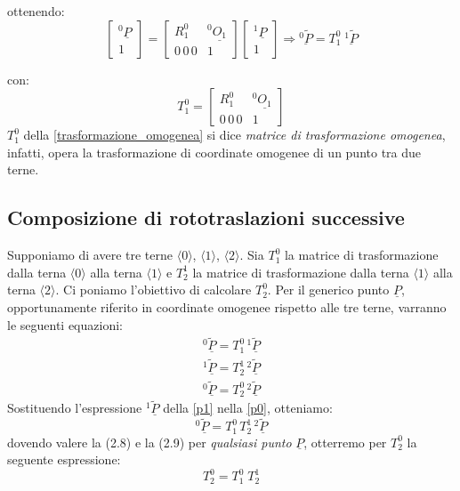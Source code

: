 ottenendo:
\begin{equation}
	\begin{bmatrix}
		^0\underline{P} \\
		1
	\end{bmatrix}
	=
	\begin{bmatrix}
		R_1^0 & ^0\underline{O_1} \\
		0\,0\,0 & 1
	\end{bmatrix}
	\begin{bmatrix}
		^1\underline{P} \\
		1
	\end{bmatrix}
	\Rightarrow
	\underline{^0\tilde{P}} = T_1^0 \; \underline{^1\tilde{P}}
\end{equation}

con:
\begin{equation} \label{trasformazione_omogenea}
	T_1^0 =
	\begin{bmatrix}
		R_1^0 & ^0\underline{O_1} \\
		0\,0\,0 & 1
	\end{bmatrix}
\end{equation}
$T_1^0$ della \eqref{trasformazione_omogenea} si dice \emph{matrice di trasformazione omogenea}, infatti, opera la trasformazione di coordinate omogenee di un punto tra due terne.
\subsection{Composizione di rototraslazioni successive}
Supponiamo di avere tre terne $\langle0\rangle$, $\langle1\rangle$, $\langle2\rangle$. Sia $T_1^0$ la matrice di trasformazione dalla terna $\langle0\rangle$ alla terna $\langle1\rangle$ e $T_2^1$ la matrice di trasformazione dalla terna $\langle1\rangle$ alla terna $\langle2\rangle$. Ci poniamo l'obiettivo di calcolare $T_2^0$. Per il generico punto $\underline{P}$, opportunamente riferito in coordinate omogenee rispetto alle tre terne, varranno le seguenti equazioni:
\begin{align} \label{p0} 
	^0\underline{\tilde{P}} = T_1^0 \, ^1\underline{\tilde{P}} \\
	\label{p1}
	^1\underline{\tilde{P}} = T_2^1 \, ^2\underline{\tilde{P}} \\
	^0\underline{\tilde{P}} = T_2^0 \, ^2\underline{\tilde{P}}
\end{align} 
Sostituendo l'espressione $^1\underline{\tilde{P}}$ della \eqref{p1} nella \eqref{p0}, otteniamo:
\begin{equation}
	^0\underline{\tilde{P}} =  T_1^0 \, T_2^1 \, ^2\underline{\tilde{P}}
\end{equation}
dovendo valere la (2.8) e la (2.9) per \emph{qualsiasi punto} $\underline{P}$, otterremo per $T_2^0$ la seguente espressione:
\begin{equation}
	T_2^0 = T_1^0 \; T_2^1
\end{equation}
